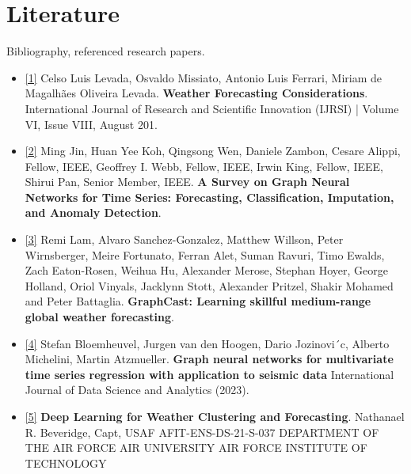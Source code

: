 \documentclass{article}
\begin{document}
	\section{Literature}
	Bibliography, referenced research papers.
    \begin{itemize}
        \item \href{https://www.rsisinternational.org/journals/ijrsi/digital-library/volume-6-issue-8/86-90.pdf}{[1]} Celso Luis Levada, Osvaldo Missiato, Antonio Luis Ferrari, Miriam de Magalhães Oliveira Levada. \textbf{Weather Forecasting Considerations}. International Journal of Research and Scientific Innovation (IJRSI) | Volume VI, Issue VIII, August 201.
        \item \href{https://arxiv.org/pdf/2307.03759.pdf}{[2]} Ming Jin, Huan Yee Koh, Qingsong Wen, Daniele Zambon, Cesare Alippi, Fellow, IEEE, Geoffrey I. Webb, Fellow, IEEE, Irwin King, Fellow, IEEE, Shirui Pan, Senior Member, IEEE. \textbf{A Survey on Graph Neural Networks for Time Series: Forecasting, Classification, Imputation, and Anomaly Detection}.
        \item \href{https://arxiv.org/pdf/2212.12794.pdf}{[3]} Remi Lam, Alvaro Sanchez-Gonzalez, Matthew Willson, Peter Wirnsberger, Meire Fortunato, Ferran Alet, Suman Ravuri, Timo Ewalds, Zach Eaton-Rosen, Weihua Hu, Alexander Merose, Stephan Hoyer, George Holland, Oriol Vinyals, Jacklynn Stott, Alexander Pritzel, Shakir Mohamed and Peter Battaglia. \textbf{GraphCast: Learning skillful medium-range global weather forecasting}.
        \item \href{https://link.springer.com/article/10.1007/s41060-022-00349-6}{[4]}
        Stefan Bloemheuvel, Jurgen van den Hoogen, Dario Jozinovi´c, Alberto Michelini, Martin Atzmueller. \textbf{Graph neural networks for multivariate time series regression with application to seismic data} International Journal of Data Science and Analytics (2023).
        \item \href{https://apps.dtic.mil/sti/trecms/pdf/AD1149667.pdf}{[5]} \textbf{Deep Learning for Weather Clustering and Forecasting}. Nathanael R. Beveridge, Capt, USAF AFIT-ENS-DS-21-S-037 DEPARTMENT OF THE AIR FORCE AIR UNIVERSITY AIR FORCE INSTITUTE OF TECHNOLOGY
    \end{itemize}
	
\end{document}
